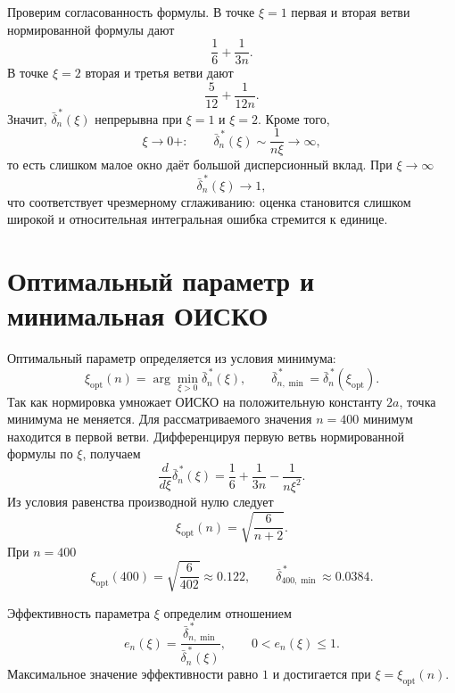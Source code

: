 \documentclass[12pt,a4paper]{article}
\begin{document}
Проверим согласованность формулы. В точке $\xi=1$ первая и вторая ветви
нормированной формулы дают
\[
\frac{1}{6}+\frac{1}{3n}.
\]
В точке $\xi=2$ вторая и третья ветви дают
\[
\frac{5}{12}+\frac{1}{12n}.
\]
Значит, $\bar{\delta}^{\,*}_n(\xi)$ непрерывна при $\xi=1$ и $\xi=2$.
Кроме того,
\[
\xi\to 0+:\qquad
\bar{\delta}^{\,*}_n(\xi)\sim \frac{1}{n\xi}\to\infty,
\]
то есть слишком малое окно даёт большой дисперсионный вклад. При
$\xi\to\infty$
\[
\bar{\delta}^{\,*}_n(\xi)\to 1,
\]
что соответствует чрезмерному сглаживанию: оценка становится слишком
широкой и относительная интегральная ошибка стремится к единице.

\section*{Оптимальный параметр и минимальная ОИСКО}

Оптимальный параметр определяется из условия минимума:
\[
\xi_{\mathrm{opt}}(n)=\arg\min_{\xi>0}\bar{\delta}^{\,*}_n(\xi),
\qquad
\bar{\delta}^{\,*}_{n,\min}=\bar{\delta}^{\,*}_n(\xi_{\mathrm{opt}}).
\]
Так как нормировка умножает ОИСКО на положительную константу $2a$, точка
минимума не меняется. Для рассматриваемого значения $n=400$ минимум
находится в первой ветви. Дифференцируя первую ветвь нормированной формулы
по $\xi$, получаем
\[
\frac{d}{d\xi}\bar{\delta}^{\,*}_n(\xi)
=\frac{1}{6}+\frac{1}{3n}
-\frac{1}{n\xi^2}.
\]
Из условия равенства производной нулю следует
\[
\xi_{\mathrm{opt}}(n)=\sqrt{\frac{6}{n+2}}.
\]
При $n=400$
\[
\xi_{\mathrm{opt}}(400)=\sqrt{\frac{6}{402}}\approx 0.122,
\qquad
\bar{\delta}^{\,*}_{400,\min}\approx 0.0384.
\]

Эффективность параметра $\xi$ определим отношением
\[
e_n(\xi)=
\frac{\bar{\delta}^{\,*}_{n,\min}}{\bar{\delta}^{\,*}_n(\xi)},
\qquad 0<e_n(\xi)\le 1.
\]
Максимальное значение эффективности равно $1$ и достигается при
$\xi=\xi_{\mathrm{opt}}(n)$.
\end{document}
